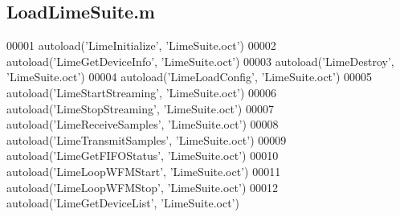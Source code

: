 \subsection{Load\+Lime\+Suite.\+m}
\label{LoadLimeSuite_8m_source}

\begin{DoxyCode}
00001 autoload(\textcolor{stringliteral}{'LimeInitialize'}, \textcolor{stringliteral}{'LimeSuite.oct'})
00002 autoload('LimeGetDeviceInfo', 'LimeSuite.oct')
00003 autoload('LimeDestroy', 'LimeSuite.oct')
00004 autoload('LimeLoadConfig', 'LimeSuite.oct')
00005 autoload('LimeStartStreaming', 'LimeSuite.oct')
00006 autoload('LimeStopStreaming', 'LimeSuite.oct')
00007 autoload('LimeReceiveSamples', 'LimeSuite.oct')
00008 autoload('LimeTransmitSamples', 'LimeSuite.oct')
00009 autoload('LimeGetFIFOStatus', 'LimeSuite.oct')
00010 autoload('LimeLoopWFMStart', 'LimeSuite.oct')
00011 autoload('LimeLoopWFMStop', 'LimeSuite.oct')
00012 autoload('LimeGetDeviceList', 'LimeSuite.oct')
\end{DoxyCode}

